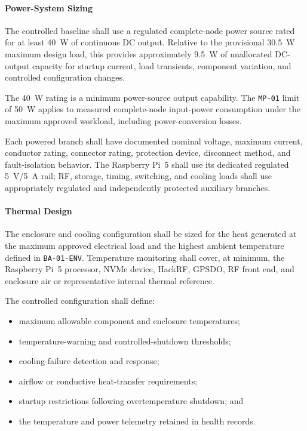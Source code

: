 \documentclass[11pt,a4paper]{article}
\begin{document}
	\paragraph*{Power-System Sizing}
	
	The controlled baseline shall use a regulated complete-node power source rated
	for at least 40~W of continuous DC output. Relative to the provisional
	30.5~W maximum design load, this provides approximately 9.5~W of unallocated
	DC-output capacity for startup current, load transients, component variation,
	and controlled configuration changes.
	
	The 40~W rating is a minimum power-source output capability. The
	\texttt{MP-01} limit of 50~W applies to measured complete-node input-power
	consumption under the maximum approved workload, including power-conversion
	losses.
	
	Each powered branch shall have documented nominal voltage, maximum current,
	conductor rating, connector rating, protection device, disconnect method, and
	fault-isolation behavior. The Raspberry Pi~5 shall use its dedicated regulated
	5~V/5~A rail; RF, storage, timing, switching, and cooling loads shall use
	appropriately regulated and independently protected auxiliary branches.
	
	\paragraph*{Thermal Design}
	
	The enclosure and cooling configuration shall be sized for the heat generated
	at the maximum approved electrical load and the highest ambient temperature
	defined in \texttt{BA-01-ENV}. Temperature monitoring shall cover, at minimum,
	the Raspberry Pi~5 processor, NVMe device, HackRF, GPSDO, RF front end, and
	enclosure air or representative internal thermal reference.
	
	The controlled configuration shall define:
	
	\begin{itemize}[leftmargin=*]
		\item maximum allowable component and enclosure temperatures;
		\item temperature-warning and controlled-shutdown thresholds;
		\item cooling-failure detection and response;
		\item airflow or conductive heat-transfer requirements;
		\item startup restrictions following overtemperature shutdown; and
		\item the temperature and power telemetry retained in health records.
	\end{itemize}
	
\end{document}
